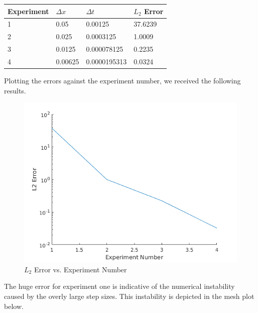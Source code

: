\documentclass[a4paper]{article}
\begin{document}
    	\begin{table}[H]
            \begin{tabular}{|l|l|l|l|}
            \hline
            Experiment & $\Delta x$ & $\Delta t$   & $L_2$ Error \\ \hline
            1          & 0.05       & 0.00125      & 37.6239\\ \hline
            2          & 0.025      & 0.0003125    & 1.0009\\ \hline
            3          & 0.0125     & 0.000078125  & 0.2235\\ \hline
            4          & 0.00625    & 0.0000195313 & 0.0324\\ \hline
            \end{tabular}
        \end{table}
     Plotting the errors against the experiment number, we received the following results.
    \begin{figure}[H]
    \caption{$L_{2}$ Error vs. Experiment Number}
    \includegraphics[scale=0.5]{FiniteDifferenceError.png}
    \end{figure}
    The huge error for experiment one is indicative of the numerical instability caused by the overly large step sizes. This instability is depicted in the mesh plot below.
\end{document}
